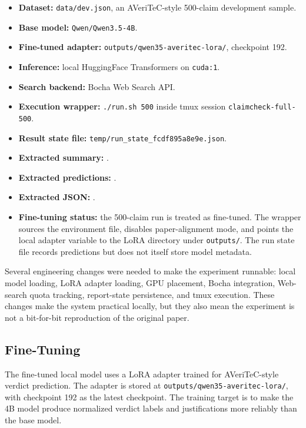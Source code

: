 \documentclass[11pt]{article}
\begin{document}
\begin{itemize}
\item \textbf{Dataset:} \texttt{data/dev.json}, an AVeriTeC-style 500-claim development sample.
\item \textbf{Base model:} \texttt{Qwen/Qwen3.5-4B}.
\item \textbf{Fine-tuned adapter:} \texttt{outputs/qwen35-averitec-lora/}, checkpoint 192.
\item \textbf{Inference:} local HuggingFace Transformers on \texttt{cuda:1}.
\item \textbf{Search backend:} Bocha Web Search API.
\item \textbf{Execution wrapper:} \texttt{./run.sh 500} inside tmux session \texttt{claimcheck-full-500}.
\item \textbf{Result state file:} \texttt{temp/run\_state\_fcdf895a8e9e.json}.
\item \textbf{Extracted summary:} .
\item \textbf{Extracted predictions:} .
\item \textbf{Extracted JSON:} .
\item \textbf{Fine-tuning status:} the 500-claim run is treated as fine-tuned. The wrapper sources the environment file, disables paper-alignment mode, and points the local adapter variable to the LoRA directory under \texttt{outputs/}. The run state file records predictions but does not itself store model metadata.
\end{itemize}

Several engineering changes were needed to make the experiment runnable: local model loading, LoRA adapter loading, GPU placement, Bocha integration, Web-search quota tracking, report-state persistence, and tmux execution. These changes make the system practical locally, but they also mean the experiment is not a bit-for-bit reproduction of the original paper.

\subsection*{Fine-Tuning}
The fine-tuned local model uses a LoRA adapter trained for AVeriTeC-style verdict prediction. The adapter is stored at \texttt{outputs/qwen35-averitec-lora/}, with checkpoint 192 as the latest checkpoint. The training target is to make the 4B model produce normalized verdict labels and justifications more reliably than the base model.
\end{document}
